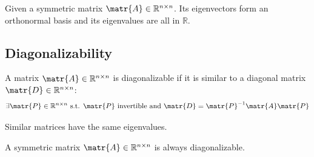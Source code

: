\begin{theorem} \label{th:spectral_theorem} 
    Given a symmetric matrix $\matr{A} \in \mathbb{R}^{n \times n}$.
    Its eigenvectors form an orthonormal basis and its eigenvalues are all in $\mathbb{R}$.
\end{theorem}


\subsection{Diagonalizability}
A matrix $\matr{A} \in \mathbb{R}^{n \times n}$ is diagonalizable if it is similar to a diagonal matrix $\matr{D} \in \mathbb{R}^{n \times n}$:
\[ \exists \matr{P} \in \mathbb{R}^{n \times n} \text{ s.t. } \matr{P} \text{ invertible and } \matr{D} = \matr{P}^{-1}\matr{A}\matr{P} \]

\begin{theorem}
    Similar matrices have the same eigenvalues.
\end{theorem}

\begin{theorem} 
    A symmetric matrix $\matr{A} \in \mathbb{R}^{n \times n}$ is always diagonalizable.
\end{theorem}
